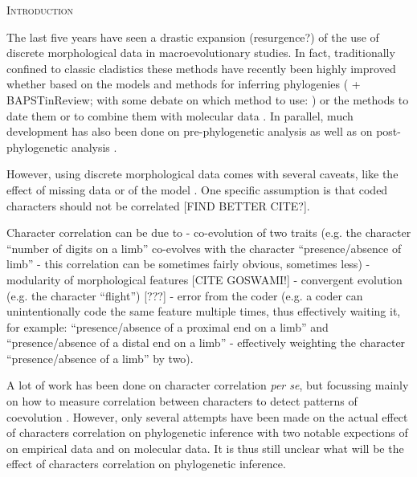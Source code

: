 \documentclass[12pt,letterpaper]{article}
\renewcommand{\section}[1]{%
\bigskip
\begin{center}
\begin{Large}
\normalfont\scshape #1
\medskip
\end{Large}
\end{center}}
\begin{document}
\section{Introduction}

The last five years have seen a drastic expansion (resurgence?) of the use of discrete morphological data in macroevolutionary studies.
In fact, traditionally confined to classic cladistics \citep{felsenstein2004inferring} these methods have recently been highly improved whether based on the models and methods for inferring phylogenies (\citealt{lewisa2001} + BAPSTinReview; with some debate on which method to use: \citealt{spencerefficacy2013,wrightbayesian2014,OReilly20160081}) or the methods to date them \citep[e.g.][]{bapsta2013} or to combine them with molecular data \citep{pyrondivergence2011,ronquista2012}.
In parallel, much development has also been done on pre-phylogenetic analysis \citep[e.g. data collection;][]{morphobank} as well as on post-phylogenetic analysis \citep[e.g. morphological disparity analysis;][]{Close2015,Claddis}.

However, using discrete morphological data comes with several caveats, like the effect of missing data \citep{Guillerme2016146} or of the model \citep{OReilly20160081}.
One specific assumption is that coded characters should not be correlated \citep{Brazeau2011}[FIND BETTER CITE?].

Character correlation can be due to
- co-evolution of two traits (e.g. the character ``number of digits on a limb'' co-evolves with the character ``presence/absence of limb'' - this correlation can be sometimes fairly obvious, sometimes less)
- modularity of morphological features [CITE GOSWAMI!]
- convergent evolution (e.g. the character ``flight'') [???]
- error from the coder (e.g. a coder can unintentionally code the same feature multiple times, thus effectively waiting it, for example: ``presence/absence of a proximal end on a limb'' and ``presence/absence of a distal end on a limb'' - effectively weighting the character ``presence/absence of a limb'' by two).

A lot of work has been done on character correlation \textit{per se}, but focussing mainly on how to measure correlation between characters to detect patterns of coevolution \citep{Lande1983,Maddison1990,Pagel1994,Pagel2006,Grabowski2016}.
However, only several attempts have been made on the actual effect of characters correlation on phylogenetic inference with two notable expections of \cite{Davalos01072014} on empirical data and \cite{ZouConvergence} on molecular data.
It is thus still unclear what will be the effect of characters correlation on phylogenetic inference.
\end{document}

